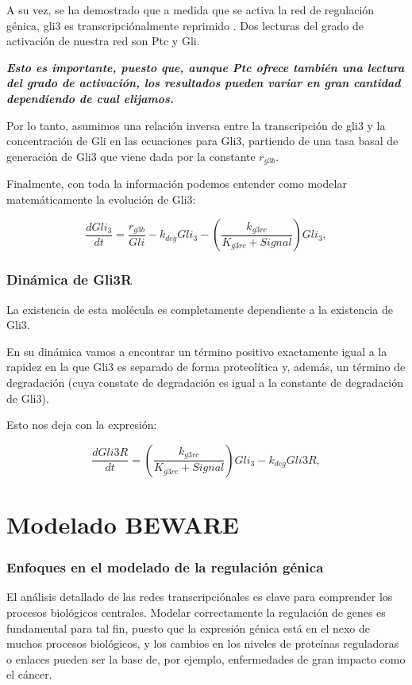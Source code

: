  A su vez, se ha demostrado que a medida que se activa la red de regulación génica, gli3 es transcripciónalmente
 reprimido \cite{wang2000hedgehog}. Dos lecturas del grado de activación de nuestra red son Ptc y Gli. 
 
 \textbf{\textit{Esto es importante, puesto que, aunque Ptc ofrece también una lectura del grado de activación, los resultados pueden variar en gran cantidad dependiendo de cual elijamos.}}
 
 Por lo tanto, asumimos una relación inversa entre la transcripción de gli3 y la concentración de Gli en las ecuaciones para Gli3, partiendo de una tasa basal de generación de Gli3 que viene dada por la constante $r_{g3b}$. 
 
 Finalmente, con toda la información podemos entender como modelar matemáticamente la evolución de Gli3:
 
  \begin{equation}
  \frac{dGli_3}{dt} = \frac{r_{g3b}}{Gli}-k_{deg}Gli_3-\left(\frac{k_{g3rc}}{K_{g3rc}+Signal}\right)Gli_3,
  \end{equation}
 
 \subsubsection{Dinámica de Gli3R}
 La existencia de esta molécula es completamente dependiente a la existencia de Gli3.
 
 En su dinámica vamos a encontrar un término positivo exactamente igual a la rapidez en la que Gli3 es separado de forma proteolítica y, además, un término de degradación (cuya constate de degradación es igual a la constante de degradación de Gli3).
 
  Esto nos deja con la expresión:

 
 \begin{equation}
 \frac{dGli3R}{dt}= \left(\frac{k_{g3rc}}{K_{g3rc}+Signal}\right)Gli_3-k_{deg}Gli3R,
 \end{equation}
 
 \section{Modelado BEWARE}
 
 \subsubsection{Enfoques en el modelado de la regulación génica}
 
 El análisis detallado de las redes transcripciónales es clave para comprender los procesos biológicos centrales. Modelar correctamente la regulación de genes es fundamental para tal fin, puesto que la expresión génica está en el nexo de muchos procesos biológicos, y los cambios en los niveles de proteínas reguladoras o enlaces pueden ser la base de, por ejemplo, enfermedades de gran impacto como el cáncer. 
 
